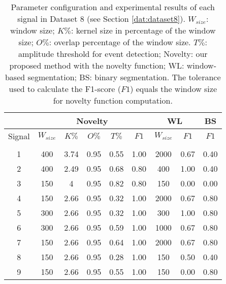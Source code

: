\begin{table}[H]
    \caption{Parameter configuration and experimental results of each signal in Dataset 8 (see Section \ref{dat:dataset8}). $W_{size}$: window size; $K\%$: kernel size in percentage of the window size; $O\%$: overlap percentage of the window size. $T\%$: amplitude threshold for event detection; Novelty: our proposed method with the novelty function; WL: window-based segmentation; BS: binary segmentation. The tolerance used to calculate the F1-score ($F1$) equals the window size for novelty function computation.}
    \centering
    \begin{tabular}{ccccccccc}
    \toprule
    & \multicolumn{5}{c}{Novelty} & \multicolumn{2}{c}{WL} & BS\\
    \midrule
    Signal &     $W_{size}$ &     $K\%$ &     $O\%$ &   $T\%$    &     $F1$ & $W_{size}$ & $F1$ & $F1$\\
\cmidrule(lr){2-6} \cmidrule(lr){7-8} \cmidrule(lr){9-9}\\

        1 & 400 & 3.74 & 0.95 & 0.55 & 1.00 & 2000 & 0.67 & 0.40 \\ 
        2 & 400 & 2.49 & 0.95 & 0.68 & 0.80 & 400 & 1.00 & 0.40 \\ 
        3 & 150 & 4 & 0.95 & 0.82 & 0.80 & 150 & 0.00 & 0.00 \\ 
        4 & 150 & 2.66 & 0.95 & 0.32 & 1.00 & 2000 & 0.67 & 0.80 \\ 
        5 & 300 & 2.66 & 0.95 & 0.32 & 1.00 & 300 & 1.00 & 0.80 \\ 
        6 & 300 & 2.66 & 0.95 & 0.59 & 1.00 & 1000 & 0.67 & 0.80 \\ 
        7 & 150 & 2.66 & 0.95 & 0.64 & 1.00 & 2000 & 0.67 & 0.80 \\ 
        8 & 150 & 2.66 & 0.95 & 0.28 & 1.00 & 150 & 0.50 & 0.40 \\ 
        9 & 150 & 2.66 & 0.95 & 0.55 & 1.00 & 150 & 0.00 & 0.80 \\ 
    \bottomrule
    \end{tabular}
\end{table}


